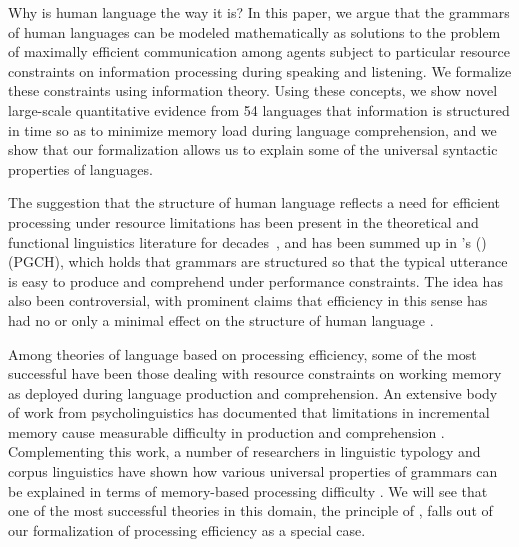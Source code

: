 

Why is human language the way it is? 
In this paper, we argue that the grammars of human languages can be modeled mathematically as solutions to the problem of maximally efficient communication among agents subject to particular resource constraints on information processing during speaking and listening.
We formalize these constraints using information theory.
Using these concepts, we show novel large-scale quantitative evidence from 54 languages that information is structured in time so as to minimize memory load during language comprehension, and
we show that our formalization allows us to explain some of the universal syntactic properties of languages.

The suggestion that the structure of human language reflects a need for efficient processing under resource limitations has been present in the theoretical and functional linguistics literature for decades~\citep{yngve1961,berwick1984grammatical,hawkins1994performance,jaeger2011language,gibson2019efficiency}, and has been summed up in \citeauthor{hawkins1994efficiency}'s (\citeyear{hawkins1994efficiency})  (PGCH), which holds that grammars are structured so that the typical utterance is easy to produce and comprehend under performance constraints.
The idea has also been controversial, with prominent claims that efficiency in this sense has had no or only a minimal effect on the structure of human language \citep{chomsky}.

Among theories of language based on processing efficiency, some of the most successful have been those dealing with resource constraints on working memory as deployed during language production and comprehension.
An extensive body of work from psycholinguistics has documented that limitations in incremental memory cause measurable difficulty in production and comprehension \citep{gibson1998syntactic,gibson1999memory,gibson2000dependency,lewis2005activationbased,bartek2011search,nicenboim2015working}. %
Complementing this work, a number of researchers in linguistic typology and corpus linguistics have shown how various universal properties of grammars can be explained in terms of memory-based processing difficulty \citep{hawkins2004efficiency,hawkins2014crosslinguistic,ferrericancho2006syntactic,gildea2010grammars,futrell2015largescale,liu2017dependency,temperley2018dependency}.
We will see that one of the most successful theories in this domain, the principle of , falls out of our formalization of processing efficiency as a special case.

